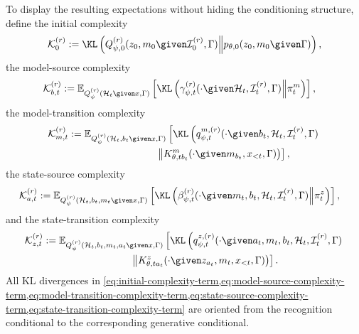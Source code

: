 To display the resulting expectations without hiding the conditioning structure, define the initial complexity
\begin{equation}
\mathcal K_0^{(r)}
:=\KL\left(
Q_{\psi,0}^{(r)}(z_0,m_0\given\mathcal I_0^{(r)},\Gamma)
\middle\Vert
p_{\theta,0}(z_0,m_0\given\Gamma)
\right),
\label{eq:initial-complexity-term}
\end{equation}
the model-source complexity
\begin{equation}
\begin{aligned}
\mathcal K_{b,t}^{(r)}
:={}&\mathbb E_{Q_\psi^{(r)}(\mathcal H_t\given x,\Gamma)}
\left[
\KL\left(
\gamma_{\psi,t}^{(r)}
(\mathord{\cdot}\given\mathcal H_t,\mathcal I_t^{(r)},\Gamma)
\middle\Vert
\pi_t^m
\right)
\right],
\end{aligned}
\label{eq:model-source-complexity-term}
\end{equation}
the model-transition complexity
\begin{equation}
\begin{aligned}
\mathcal K_{m,t}^{(r)}
:={}&\mathbb E_{Q_\psi^{(r)}
(\mathcal H_t,b_t\given x,\Gamma)}
\left[
\KL\left(
q_{\psi,t}^{m,(r)}
(\mathord{\cdot}\given b_t,\mathcal H_t,
\mathcal I_t^{(r)},\Gamma)
\right.\right.\\
&\left.\left.\hspace{7em}\middle\Vert
K^m_{\theta,tb_t}
(\mathord{\cdot}\given m_{b_t},x_{<t},\Gamma)
\right)
\right],
\end{aligned}
\label{eq:model-transition-complexity-term}
\end{equation}
the state-source complexity
\begin{equation}
\begin{aligned}
\mathcal K_{a,t}^{(r)}
:={}&\mathbb E_{Q_\psi^{(r)}
(\mathcal H_t,b_t,m_t\given x,\Gamma)}
\left[
\KL\left(
\beta_{\psi,t}^{(r)}
(\mathord{\cdot}\given m_t,b_t,\mathcal H_t,
\mathcal I_t^{(r)},\Gamma)
\middle\Vert
\pi_t^z
\right)
\right],
\end{aligned}
\label{eq:state-source-complexity-term}
\end{equation}
and the state-transition complexity
\begin{equation}
\begin{aligned}
\mathcal K_{z,t}^{(r)}
:={}&\mathbb E_{Q_\psi^{(r)}
(\mathcal H_t,b_t,m_t,a_t\given x,\Gamma)}
\left[
\KL\left(
q_{\psi,t}^{z,(r)}
(\mathord{\cdot}\given a_t,m_t,b_t,\mathcal H_t,
\mathcal I_t^{(r)},\Gamma)
\right.\right.\\
&\left.\left.\hspace{7em}\middle\Vert
K^z_{\theta,ta_t}
(\mathord{\cdot}\given z_{a_t},m_t,x_{<t},\Gamma)
\right)
\right].
\end{aligned}
\label{eq:state-transition-complexity-term}
\end{equation}
All KL divergences in \cref{eq:initial-complexity-term,eq:model-source-complexity-term,eq:model-transition-complexity-term,eq:state-source-complexity-term,eq:state-transition-complexity-term} are oriented from the recognition conditional to the corresponding generative conditional.

